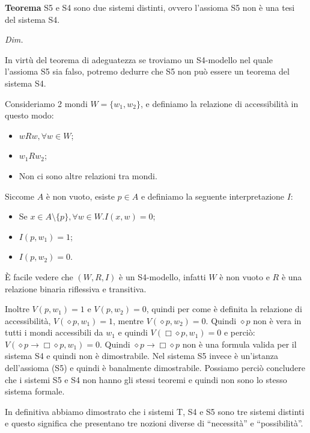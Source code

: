 \documentclass[a4paper, titlepage, 12pt]{report}
\begin{document}
\begin{flushleft}
\textbf{Teorema}
S5 e S4 sono due sistemi distinti, ovvero l'assioma S5 non è una tesi del sistema S4.

\textit{Dim.}

In virtù del teorema di adeguatezza se troviamo un S4-modello nel quale l'assioma S5
sia falso, potremo dedurre che S5 non può essere un teorema del sistema S4.

Consideriamo 2 mondi $W = \{w_1, w_2\}$, e definiamo la relazione di accessibilità
in questo modo:
\begin{itemize}
    \item $wRw, \forall w \in W$;
    \item $w_1Rw_2$;
    \item Non ci sono altre relazioni tra mondi.
\end{itemize}

Siccome $A$ è non vuoto, esiste $p \in A$ e definiamo la seguente interpretazione $I:$
\begin{itemize}
    \item Se $x \in A \setminus \{p\}, \forall w \in W. I(x, w) = 0$;
    \item $I(p, w_1) = 1$;
    \item $I(p, w_2) = 0$.
\end{itemize}

È facile vedere che $(W, R, I)$ è un S4-modello, infatti $W$ è non vuoto e
$R$ è una relazione binaria riflessiva e transitiva.

Inoltre $V(p, w_1) = 1$ e $V(p, w_2) = 0$, quindi per come è definita
la relazione di accessibilità, $V(\diamond p, w_1) = 1$, mentre
$V(\diamond p, w_2) = 0$. Quindi $\diamond p$ non è vera in tutti i mondi accessibili da $w_1$
e quindi $V(\Box \diamond p, w_1) = 0$ e perciò: $V(\diamond p \rightarrow \Box\diamond p, w_1) = 0$.
Quindi $\diamond p \rightarrow \Box\diamond p$ non è una formula valida per il sistema S4 e quindi
non è dimostrabile.
Nel sistema S5 invece è un'istanza dell'assioma (S5) e quindi è banalmente dimostrabile.
Possiamo perciò concludere che i sistemi S5 e S4 non hanno gli stessi teoremi e quindi non
sono lo stesso sistema formale.


\end{flushleft}

In definitiva abbiamo dimostrato che i sistemi T, S4 e S5 sono tre sistemi distinti
e questo significa che presentano tre nozioni diverse di ``necessità'' e ``possibilità''.
\end{document}
